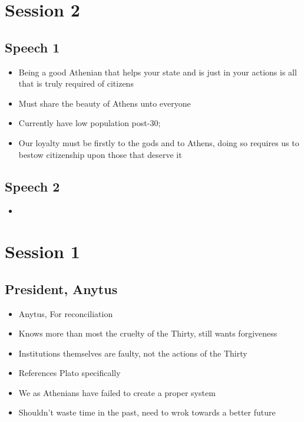 \documentclass[11pt]{article}
\author{Sudhan Chitgopkar}
\date{\today}
\title{}
\begin{document}
\tableofcontents

\section{Session 2}
\label{sec:org5e0eee9}
\subsection{Speech 1}
\label{sec:orgaabbe87}
\begin{itemize}
\item Being a good Athenian that helps your state and is just in your actions is all that is truly
required of citizens
\item Must share the beauty of Athens unto everyone
\item Currently have low population post-30;
\item Our loyalty must be firstly to the gods and to Athens, doing so requires us to bestow citizenship
upon those that deserve it
\end{itemize}
\subsection{Speech 2}
\label{sec:org4d9a110}
\begin{itemize}
\item 
\end{itemize}
\section{Session 1}
\label{sec:org7431377}
\subsection{President, Anytus}
\label{sec:org61bed50}
\begin{itemize}
\item Anytus, For reconciliation
\item Knows more than most the cruelty of the Thirty, still wants forgiveness
\item Institutions themselves are faulty, not the actions of the Thirty
\item References Plato specifically
\item We as Athenians have failed to create a proper system
\item Shouldn't waste time in the past, need to wrok towards a better future
\end{itemize}
\end{document}
